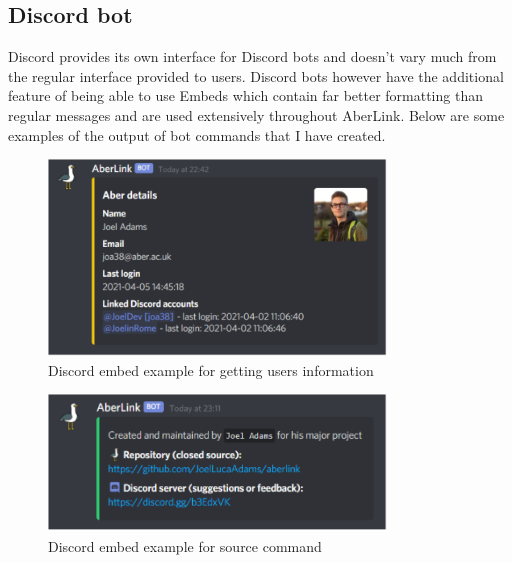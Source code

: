 \subsection{Discord bot}
Discord provides its own interface for Discord bots and doesn't vary much from the regular interface provided to users. Discord bots however have the additional feature of being able to use Embeds which contain far better formatting than regular messages and are used extensively throughout AberLink. Below are some examples of the output of bot commands that I have created.
\begin{figure}[H]
	\centering
	\includegraphics[width=0.8\textwidth]{Figures/test-2}
	\caption{Discord embed example for getting users information}
	\label{fig:dis-go}
\end{figure}
\begin{figure}[H]
	\centering
	\includegraphics[width=0.8\textwidth]{Figures/test}
	\caption{Discord embed example for source command}
	\label{fig:dis-source}
\end{figure}

